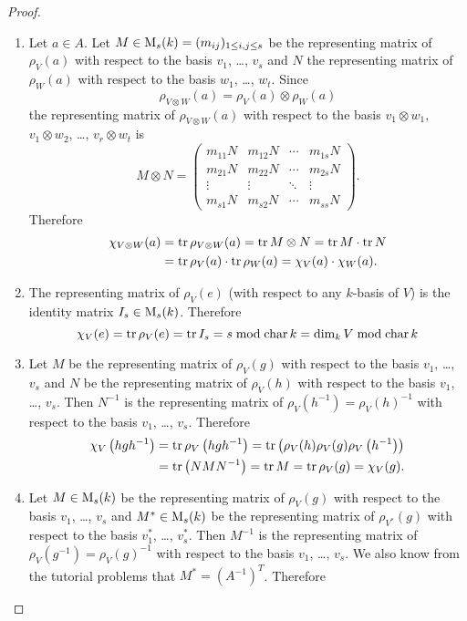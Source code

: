 \begin{proof}
\begin{enumerate}[label=\emph{\alph*)},leftmargin=*]
  \item
   Let $a \in A$. Let $M \in \operatorname{M}_s(k) = (m_{ij})_{1 \leq i,j \leq s}$ be the representing matrix of $\rho_V(a)$ with respect to the basis $v_1$, \dots, $v_s$ and $N$ the representing matrix of $\rho_W(a)$ with respect to the basis $w_1$, \dots, $w_t$. Since
   \[
    \rho_{V \otimes W}(a) = \rho_V(a) \otimes \rho_W(a)
   \]
   the representing matrix of $\rho_{V \otimes W}(a)$ with respect to the basis $v_1 \otimes w_1$, $v_1 \otimes w_2$, \dots, $v_r \otimes w_t$ is
   \[
    M \otimes N =
    \begin{pmatrix}
     m_{11} N & m_{12} N & \cdots & m_{1s} N \\
     m_{21} N & m_{22} N & \cdots & m_{2s} N \\
     \vdots   & \vdots   & \ddots & \vdots   \\
     m_{s1} N & m_{s2} N & \cdots & m_{ss} N
    \end{pmatrix}.
   \]
   Therefore
   \begin{align*}
    \chi_{V \otimes W}(a)
    &= \operatorname{tr} \rho_{V \otimes W}(a)
    = \operatorname{tr} M \otimes N
    = \operatorname{tr} M \cdot \operatorname{tr} N \\
    &= \operatorname{tr} \rho_V(a) \cdot \operatorname{tr} \rho_W(a)
    = \chi_V(a) \cdot \chi_W(a).
   \end{align*}
  \item
   The representing matrix of $\rho_V(e)$ (with respect to any $k$-basis of $V$) is the identity matrix $I_s \in \operatorname{M}_s(k)$. Therefore
   \[
    \chi_V(e) = \operatorname{tr} \rho_V(e) = \operatorname{tr} I_s = s \bmod \operatorname{char} k = \dim_k V \bmod \operatorname{char} k
   \]
  \item
   Let $M$ be the representing matrix of $\rho_V(g)$ with respect to the basis $v_1$, \dots, $v_s$ and $N$ be the representing matrix of $\rho_V(h)$ with respect to the basis $v_1$, \dots, $v_s$. Then $N^{-1}$ is the representing matrix of $\rho_V(h^{-1}) = \rho_V(h)^{-1}$ with respect to the basis $v_1$, \dots, $v_s$. Therefore
   \begin{align*}
    \chi_V\left( hgh^{-1} \right)
    &= \operatorname{tr} \rho_V\left( hgh^{-1} \right)
    = \operatorname{tr}\left( \rho_V(h) \rho_V(g) \rho_V\left( h^{-1} \right) \right) \\
    &= \operatorname{tr}\left( NMN^{-1} \right)
    = \operatorname{tr} M
    = \operatorname{tr} \rho_V(g)
    = \chi_V(g).
   \end{align*}
  \item
   Let $M \in \operatorname{M}_s(k)$ be the representing matrix of $\rho_V(g)$ with respect to the basis $v_1$, \dots, $v_s$ and $M^* \in \operatorname{M}_s(k)$ be the representing matrix of $\rho_{V^*}(g)$ with respect to the basis $v_1^*$, \dots, $v_s^*$. Then $M^{-1}$ is the representing matrix of $\rho_V(g^{-1}) = \rho_V(g)^{-1}$ with respect to the basis $v_1$, \dots, $v_s$. We also know from the tutorial problems that $M^* = \left(A^{-1}\right)^T$. Therefore

\end{enumerate}
\end{proof}
